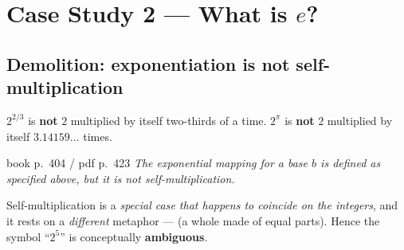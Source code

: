 \clearpage
\renewcommand{\sectioncolor}{csB}
\section{Case Study 2 — What is \texorpdfstring{$e$}{e}?}
\noindent{}\;\;

\vspace{6pt}
\subsection{Demolition: exponentiation is not self-multiplication}

\begin{critbox}[title={The confusion that survives into university teaching}]
$2^{2/3}$ is \textbf{not} $2$ multiplied by itself two-thirds of a time. $2^{\pi}$ is \textbf{not} $2$
multiplied by itself $3.14159\ldots$ times.
\begin{bookquote}{book p.~404 / pdf p.~423}
\textit{The exponential mapping for a base $b$ is defined as specified above, but it is not
self-multiplication.}
\end{bookquote}
Self-multiplication is a \emph{special case that happens to coincide on the integers}, and it rests
on a \emph{different} metaphor ---  (a whole made of equal
parts). Hence the symbol ``$2^5$'' is conceptually \textbf{ambiguous}.
\end{critbox}

